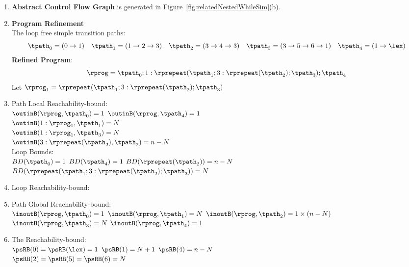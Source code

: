 \begin{enumerate}
  \item  \textbf{Abstract Control Flow Graph} is generated in Figure~\ref{fig:relatedNestedWhileSim}(b).

  \item \textbf{Program Refinement}
  \\
  The loop free simple transition paths:
  \[
          \tpath_0 = (0 \to 1)
          \quad
          \tpath_1 = (1 \to 2 \to 3)
          \quad           
          \tpath_2 = (3 \to 4 \to 3)
          \quad
          \tpath_3 = (3 \to 5 \to 6 \to 1)
          \quad
          \tpath_4 = (1 \to \lex)
      \]
  \textbf{Refined Program}:
  \[
  \rprog = \tpath_0 ; 1: \rprepeat(\tpath_1; 3: \rprepeat(\tpath_2); \tpath_3); \tpath_4
  \]
 Let $\rprog_1 = \rprepeat(\tpath_1; 3: \rprepeat(\tpath_2); \tpath_3)$
\item {Path Local Reachability-bound}:
\\
$\outinB(\rprog, \tpath_0) = 1$ \quad
$\outinB(\rprog, \tpath_4) = 1$ \\
$\outinB(1: \rprog_1, \tpath_1) = N$ \\
$\outinB(1: \rprog_1, \tpath_3) = N$ \\
$\outinB(3: \rprepeat(\tpath_2), \tpath_2) = n - N$ 
\\
Loop Bounds:
\\
$BD(\tpath_0) = 1$
\quad
$BD(\tpath_4) = 1$
\quad
$BD(\rprepeat(\tpath_2)) = n - N $
\\
$BD(\rprepeat(\tpath_1; 3: \rprepeat(\tpath_2); \tpath_3)) = N $
%
\item Loop Reachability-bound:
\\
%
%
\item Path Global Reachability-bound:
\\
$\inoutB(\rprog, \tpath_0) = 1$ \quad
$\inoutB(\rprog, \tpath_1) = N$ \quad
$\inoutB(\rprog, \tpath_2) = 1 \times (n - N)$ \\
$\inoutB(\rprog, \tpath_3) = N$ \quad
$\inoutB(\rprog, \tpath_4) = 1$
%
\item The Reachability-bound:
\\
$\psRB(0) = \psRB(\lex) = 1$ \quad
$\psRB(1) = N + 1$ \quad
$\psRB(4) = n - N$ \quad \\
$\psRB(2) = \psRB(5) =  \psRB(6) = N$ \quad
{}
\end{enumerate}